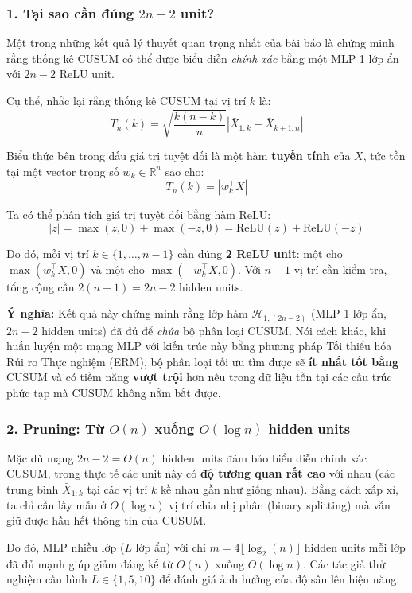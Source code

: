 \subsubsection*{1. Tại sao cần đúng $2n-2$ unit?}

Một trong những kết quả lý thuyết quan trọng nhất của bài báo là chứng minh rằng thống kê CUSUM 
có thể được biểu diễn \textit{chính xác} bằng một MLP 1 lớp ẩn với $2n-2$ ReLU unit.

Cụ thể, nhắc lại rằng thống kê CUSUM tại vị trí $k$ là:
\[
T_n(k) = \sqrt{\frac{k(n-k)}{n}} \left| \bar{X}_{1:k} - \bar{X}_{k+1:n} \right|
\]

Biểu thức bên trong dấu giá trị tuyệt đối là một hàm \textbf{tuyến tính} của $X$, 
tức tồn tại một vector trọng số $w_k \in \mathbb{R}^n$ sao cho:
\[
T_n(k) = |w_k^\top X|
\]

Ta có thể phân tích giá trị tuyệt đối bằng hàm ReLU:
\begin{equation}
    |z| = \max(z, 0) + \max(-z, 0) = \text{ReLU}(z) + \text{ReLU}(-z)
\end{equation}

Do đó, mỗi vị trí $k \in \{1, \ldots, n-1\}$ cần đúng \textbf{2 ReLU unit}: 
một cho $\max(w_k^\top X, 0)$ và một cho $\max(-w_k^\top X, 0)$. 
Với $n-1$ vị trí cần kiểm tra, tổng cộng cần $2(n-1) = 2n - 2$ hidden units.

\textbf{Ý nghĩa:} Kết quả này chứng minh rằng lớp hàm $\mathcal{H}_{1, (2n-2)}$ 
(MLP 1 lớp ẩn, $2n-2$ hidden units) đã đủ để \textit{chứa} bộ phân loại CUSUM. 
Nói cách khác, khi huấn luyện một mạng MLP với kiến trúc này bằng phương pháp Tối thiểu hóa Rủi ro Thực nghiệm (ERM),
bộ phân loại tối ưu tìm được sẽ \textbf{ít nhất tốt bằng} CUSUM và có tiềm năng \textbf{vượt trội} hơn nếu trong
 dữ liệu tồn tại các cấu trúc phức tạp mà CUSUM không nắm bắt được.

\subsubsection*{2. Pruning: Từ $O(n)$ xuống $O(\log n)$ hidden units}

Mặc dù mạng $2n-2 = O(n)$ hidden units đảm bảo biểu diễn chính xác CUSUM, trong thực tế các unit 
này có \textbf{độ tương quan rất cao} với nhau (các trung bình $\bar{X}_{1:k}$ tại các vị trí $k$ 
kề nhau gần như giống nhau). Bằng cách xấp xỉ, ta chỉ cần lấy mẫu ở $O(\log n)$ vị trí chia 
nhị phân (binary splitting) mà vẫn giữ được hầu hết thông tin của CUSUM.

Do đó, MLP nhiều lớp ($L$ lớp ẩn) với chỉ $m = 4\lfloor \log_2(n) \rfloor$ hidden units mỗi lớp đã đủ mạnh 
giúp giảm đáng kể từ $O(n)$ xuống $O(\log n)$. Các tác giả thử nghiệm cấu hình $L \in \{1, 5, 10\}$ 
để đánh giá ảnh hưởng của độ sâu lên hiệu năng.

